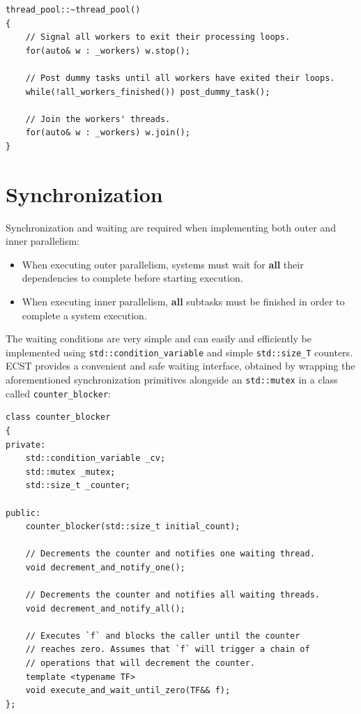 \documentclass[oneside, 12pt, a4paper, openany]{book}
\begin{document}
\begin{verbatim}
thread_pool::~thread_pool()
{
    // Signal all workers to exit their processing loops.
    for(auto& w : _workers) w.stop();

    // Post dummy tasks until all workers have exited their loops.
    while(!all_workers_finished()) post_dummy_task();

    // Join the workers' threads.
    for(auto& w : _workers) w.join();
}
\end{verbatim}

\section{Synchronization}\label{synchronization}

Synchronization and waiting are required when implementing both outer
and inner parallelism:

\begin{itemize}
\item
  When executing outer parallelism, systems must wait for \textbf{all}
  their dependencies to complete before starting execution.
\item
  When executing inner parallelism, \textbf{all} subtasks must be
  finished in order to complete a system execution.
\end{itemize}

The waiting conditions are very simple and can easily and efficiently be
implemented using
\texttt{std::condition_variable}
and simple
\texttt{std::size_T}
counters. ECST provides a convenient and safe waiting interface,
obtained by wrapping the aforementioned synchronization primitives
alongside an
\texttt{std::mutex}
in a class called
\texttt{counter_blocker}:

\begin{verbatim}
class counter_blocker
{
private:
    std::condition_variable _cv;
    std::mutex _mutex;
    std::size_t _counter;

public:
    counter_blocker(std::size_t initial_count);

    // Decrements the counter and notifies one waiting thread.
    void decrement_and_notify_one();

    // Decrements the counter and notifies all waiting threads.
    void decrement_and_notify_all();

    // Executes `f` and blocks the caller until the counter
    // reaches zero. Assumes that `f` will trigger a chain of
    // operations that will decrement the counter.
    template <typename TF>
    void execute_and_wait_until_zero(TF&& f);
};
\end{verbatim}
\end{document}
